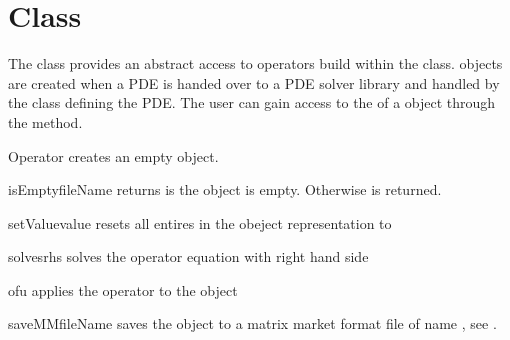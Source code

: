 \section{\Operator Class}
The \Operator class provides an abstract access to operators build
within the \LinearPDE class. \Operator objects are created 
when a PDE is handed over to a PDE solver library and handled
by the \LinearPDE class defining the PDE. The user can gain access
to the \Operator of a \LinearPDE object through the 
method.

\begin{classdesc}{Operator}{}
creates an empty \Operator object.
\end{classdesc}

\begin{methoddesc}[Operator]{isEmpty}{fileName}
returns \True is the object is empty. Otherwise \True is returned.
\end{methoddesc}

\begin{methoddesc}[Operator]{setValue}{value}
resets all entires in the obeject representation to 
\end{methoddesc}

\begin{methoddesc}[Operator]{solves}{rhs}
solves the operator equation with right hand side 
\end{methoddesc}

\begin{methoddesc}[Operator]{of}{u}
applies the operator to the \Data object 
\end{methoddesc}

\begin{methoddesc}[Operator]{saveMM}{fileName}
saves the object to a matrix market format file of name
, see
.
\end{methoddesc}

